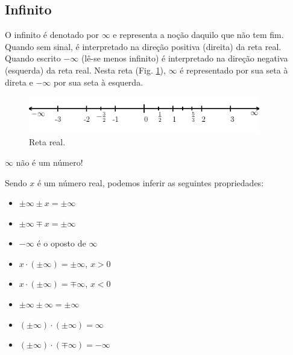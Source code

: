 \subsection{Infinito}

O infinito é denotado por $\infty$ e representa a noção daquilo que não tem fim. Quando sem sinal, é interpretado na direção positiva (direita) da reta real. Quando escrito $-\infty$ (lê-se menos infinito) é interpretado na direção negativa (esquerda) da reta real. Nesta reta (Fig. \ref{fig:conjreal_retareal_infty}), $\infty$ é representado por sua seta à direta e $-\infty$ por sua seta à esquerda.

\begin{figure}[H]
  \centering
  \includegraphics[width=0.9\textwidth]{./cap_numreal/dados/fig_retareal_infty/fig}
  \caption{Reta real.}
  \label{fig:conjreal_retareal_infty}
\end{figure}


\begin{obs}
  $\infty$ não é um número!
\end{obs}

Sendo $x$ é um número real, podemos inferir as seguintes propriedades:
\begin{itemize}
\item $\pm\infty \pm x = \pm\infty$ \\
\item $\pm\infty \mp x = \pm\infty$ \\
\item $-\infty$ é o oposto de $\infty$ \\
\item $x\cdot(\pm\infty) = \pm\infty$, $x>0$
\item $x\cdot(\pm\infty) = \mp\infty$, $x<0$
\item $\pm\infty \pm \infty = \pm\infty$ \\
\item $(\pm\infty)\cdot(\pm\infty) = \infty$ \\
\item $(\pm\infty)\cdot(\mp\infty) = -\infty$
\end{itemize}

